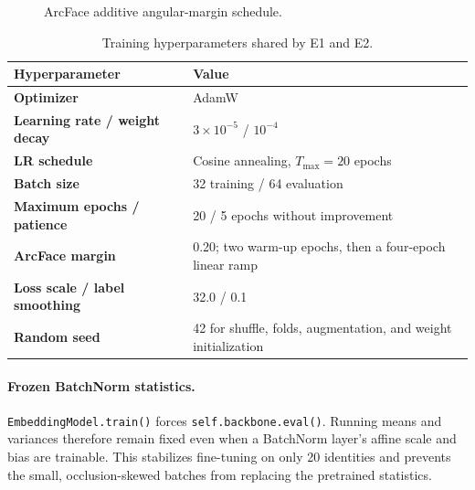 \documentclass[11pt,a4paper]{article}
\newcommand{\code}[1]{\texttt{#1}}
\begin{document}
\begin{figure}[H]
\centering
{}
\caption{ArcFace additive angular-margin schedule.}
\end{figure}

\begin{table}[H]
\centering
\caption{Training hyperparameters shared by E1 and E2.}
\begin{tabularx}{.88\linewidth}{>{\bfseries}lX}
\toprule
Hyperparameter & Value\\
\midrule
Optimizer & AdamW\\
Learning rate / weight decay & $3\times10^{-5}$ / $10^{-4}$\\
LR schedule & Cosine annealing, $T_{\max}=20$ epochs\\
Batch size & 32 training / 64 evaluation\\
Maximum epochs / patience & 20 / 5 epochs without improvement\\
ArcFace margin & 0.20; two warm-up epochs, then a four-epoch linear ramp\\
Loss scale / label smoothing & 32.0 / 0.1\\
Random seed & 42 for shuffle, folds, augmentation, and weight initialization\\
\bottomrule
\end{tabularx}
\end{table}

\paragraph{Frozen BatchNorm statistics.} \code{EmbeddingModel.train()} forces \code{self.backbone.eval()}. Running means and variances therefore remain fixed even when a BatchNorm layer's affine scale and bias are trainable. This stabilizes fine-tuning on only 20 identities and prevents the small, occlusion-skewed batches from replacing the pretrained statistics.
\end{document}

